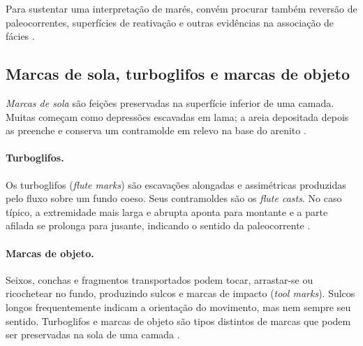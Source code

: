 Para sustentar uma interpretação de marés, convém procurar também
reversão de paleocorrentes, superfícies de reativação e outras evidências
na associação de fácies \autocite{kgsheterolitica}.

\subsection{Marcas de sola, turboglifos e marcas de objeto}

\emph{Marcas de sola} são feições preservadas na superfície inferior de
uma camada. Muitas começam como depressões escavadas em lama; a areia
depositada depois as preenche e conserva um contramolde em relevo na
base do arenito \autocite{solemarks1957}.

\paragraph{Turboglifos.}
Os turboglifos (\emph{flute marks}) são escavações alongadas e assimétricas
produzidas pelo fluxo sobre um fundo coeso. Seus contramoldes são os
\emph{flute casts}. No caso típico, a extremidade mais larga e abrupta
aponta para montante e a parte afilada se prolonga para jusante,
indicando o sentido da paleocorrente \autocite{solemarks1957,kgssolemarks}.

\paragraph{Marcas de objeto.}
Seixos, conchas e fragmentos transportados podem tocar, arrastar-se ou
ricochetear no fundo, produzindo sulcos e marcas de impacto
(\emph{tool marks}). Sulcos longos frequentemente indicam a orientação
do movimento, mas nem sempre seu sentido. Turboglifos e marcas de objeto
são tipos distintos de marcas que podem ser preservadas na sola de uma
camada \autocite{solemarks1957}.

